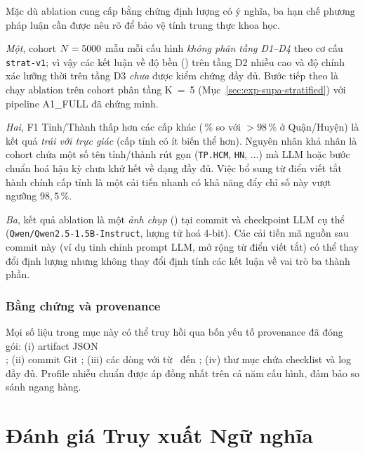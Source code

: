 Mặc dù ablation cung cấp bằng chứng định lượng có ý nghĩa, ba hạn chế phương pháp luận cần được nêu rõ để bảo vệ tính trung thực khoa học.

\emph{Một}, cohort \(N = 5000\) mẫu mỗi cấu hình \emph{không phân tầng D1--D4} theo cơ cấu \texttt{strat-v1}; vì vậy các kết luận về độ bền () trên tầng D2 nhiễu cao và độ chính xác lưỡng thời trên tầng D3 \emph{chưa} được kiểm chứng đầy đủ. Bước tiếp theo là chạy ablation trên cohort phân tầng K~=~5 (Mục~\ref{sec:exp-supa-stratified}) với pipeline A1\_FULL đã chứng minh.

\emph{Hai}, F1 Tỉnh/Thành thấp hơn các cấp khác (\VNAIABLATIONAOneFOneProvincePct\,\% so với \(>98\,\%\) ở Quận/Huyện) là kết quả \emph{trái với trực giác} (cấp tỉnh có ít biến thể hơn). Nguyên nhân khả nhân là cohort chứa một số tên tỉnh/thành rút gọn (\texttt{TP.HCM}, \texttt{HN}, ...) mà LLM hoặc bước chuẩn hoá hậu kỳ chưa khử hết về dạng đầy đủ. Việc bổ sung từ điển viết tắt hành chính cấp tỉnh là một cải tiến nhanh có khả năng đẩy chỉ số này vượt ngưỡng \(98{,}5\,\%\).

\emph{Ba}, kết quả ablation là một \emph{ảnh chụp} () tại commit \texttt{\VNAIABLATIONGitCommit} và checkpoint LLM cụ thể (\texttt{Qwen/Qwen2.5-1.5B-Instruct}, lượng tử hoá 4-bit). Các cải tiến mã nguồn sau commit này (ví dụ tinh chỉnh prompt LLM, mở rộng từ điển viết tắt) có thể thay đổi định lượng nhưng không thay đổi định tính các kết luận về vai trò ba thành phần.

\subsubsection{Bằng chứng và provenance}
\label{sec:exp-ablation-provenance}

Mọi số liệu trong mục này có thể truy hồi qua bốn yếu tố provenance đã đóng gói: (i) artifact JSON \\ ; (ii) commit Git \texttt{\VNAIABLATIONGitCommit}; (iii) các dòng  với  từ \VNAIABLATIONAOneRunId\, đến \VNAIABLATIONAFourRunId; (iv) thư mục  chứa checklist và log đầy đủ. Profile nhiễu chuẩn \texttt{\VNAIABLATIONNoiseProfile} được áp đồng nhất trên cả năm cấu hình, đảm bảo so sánh ngang hàng.

\section{Đánh giá Truy xuất Ngữ nghĩa}
\label{sec:exp-retrieval}

